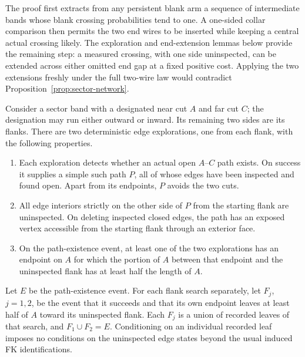 The proof first extracts from any persistent blank arm a sequence of
intermediate bands whose blank crossing probabilities tend to one.
A one-sided collar
comparison then permits the two end wires to be inserted while keeping
a central actual crossing likely.  The exploration and end-extension
lemmas below provide the remaining step: a measured crossing, with one
side uninspected, can be extended across either omitted end gap at a
fixed positive cost.
Applying the two extensions freshly under the full two-wire law would
contradict Proposition~\ref{prop:sector-network}.

\begin{lemma}
\label{sector:frontier}
Consider a sector band with a designated near cut $A$ and far cut $C$;
the designation may run either outward or inward.  Its remaining two
sides are its flanks.  There are two deterministic edge explorations,
one from each flank, with the following properties.
\begin{enumerate}[label=\textup{(\roman*)}]
\item Each exploration detects whether an actual open $A$--$C$ path
exists.  On success it supplies a simple such path $P$, all of whose
edges have been inspected and found open.  Apart from its endpoints,
$P$ avoids the two cuts.
\item All edge interiors strictly on the other side of $P$ from the
starting flank are uninspected.  On deleting inspected closed edges,
the path has an exposed vertex accessible from the starting flank through an
exterior face.
\item On the path-existence event, at least one of the two explorations
has an endpoint on $A$ for which the portion of $A$ between that
endpoint and the uninspected flank has at least half the length of $A$.
\end{enumerate}
Let $E$ be the path-existence event.  For each flank search separately,
let $F_j$, $j=1,2$, be the event that it succeeds and that its own
endpoint leaves at least half of $A$ toward its uninspected flank.
Each $F_j$ is a union of recorded leaves of that search, and
$F_1\cup F_2=E$.  Conditioning on an individual recorded leaf imposes
no conditions on the uninspected edge states beyond the usual induced
FK identifications.
\end{lemma}

